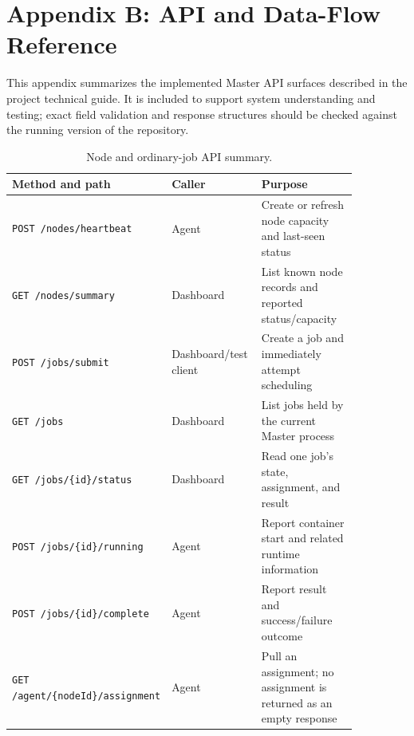 \documentclass{article}
\begin{document}
\pagebreak
\section{Appendix B: API and Data-Flow Reference}
This appendix summarizes the implemented Master API surfaces described in the project technical guide. It is included to support system understanding and testing; exact field validation and response structures should be checked against the running version of the repository.

\begin{table}[h!]
\centering
\caption{Node and ordinary-job API summary.}
\label{tab:api-jobs}
\begin{tabular}{|p{0.22\linewidth}|p{0.28\linewidth}|p{0.36\linewidth}|}
\hline
Method and path & Caller & Purpose \\
\hline
\texttt{POST /nodes/heartbeat} & Agent & Create or refresh node capacity and last-seen status \\
\hline
\texttt{GET /nodes/summary} & Dashboard & List known node records and reported status/capacity \\
\hline
\texttt{POST /jobs/submit} & Dashboard/test client & Create a job and immediately attempt scheduling \\
\hline
\texttt{GET /jobs} & Dashboard & List jobs held by the current Master process \\
\hline
\texttt{GET /jobs/\{id\}/status} & Dashboard & Read one job's state, assignment, and result \\
\hline
\texttt{POST /jobs/\{id\}/running} & Agent & Report container start and related runtime information \\
\hline
\texttt{POST /jobs/\{id\}/complete} & Agent & Report result and success/failure outcome \\
\hline
\texttt{GET /agent/\{nodeId\}/assignment} & Agent & Pull an assignment; no assignment is returned as an empty response \\
\hline
\end{tabular}
\end{table}
\end{document}
